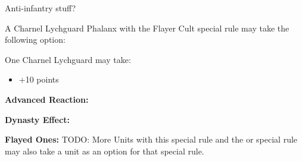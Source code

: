 \begin{multicols}{2}
Anti-infantry stuff?

A Charnel Lychguard Phalanx with the Flayer Cult special rule may take the following option:

One Charnel Lychguard may take:
\begin{itemize}
	\item {} \dotfill +10 points
\end{itemize} 

\textbf{Advanced Reaction:}

\textbf{Dynasty Effect:}

\textbf{Flayed Ones:} TODO: More Units with this special rule and the  or  special rule may also take a  unit as an option for that special rule.


\end{multicols}